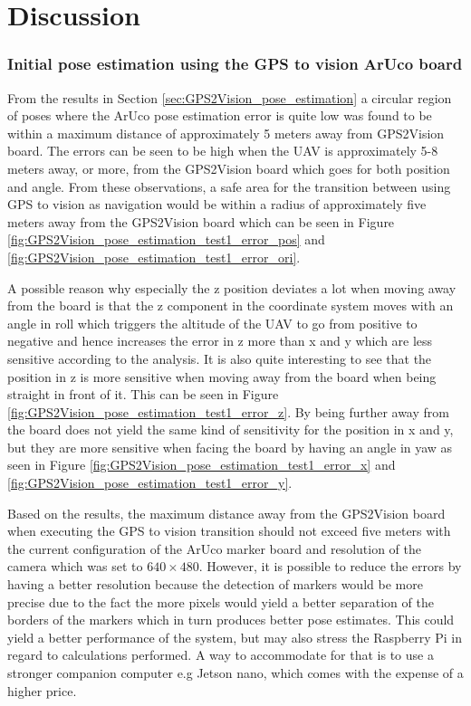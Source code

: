 \documentclass[../Head/report.tex]{subfiles}
\begin{document}
\section{Discussion}
\label{sec:discussion}

\subsubsection*{Initial pose estimation using the GPS to vision ArUco board}
From the results in Section \ref{sec:GPS2Vision_pose_estimation} a circular region of poses where the ArUco pose estimation error is quite low was found to be within a maximum distance of approximately 5 meters away from GPS2Vision board. The errors can be seen to be high when the UAV is approximately 5-8 meters away, or more, from the GPS2Vision board which goes for both position and angle. From these observations, a safe area for the transition between using GPS to vision as navigation would be within a radius of approximately five meters away from the GPS2Vision board which can be seen in Figure \ref{fig:GPS2Vision_pose_estimation_test1_error_pos} and \ref{fig:GPS2Vision_pose_estimation_test1_error_ori}. 

A possible reason why especially the z position deviates a lot when moving away from the board is that the z component in the coordinate system moves with an angle in roll which triggers the altitude of the UAV to go from positive to negative and hence increases the error in z more than x and y which are less sensitive according to the analysis. It is also quite interesting to see that the position in z is more sensitive when moving away from the board when being straight in front of it. This can be seen in Figure \ref{fig:GPS2Vision_pose_estimation_test1_error_z}. By being further away from the board does not yield the same kind of sensitivity for the position in x and y, but they are more sensitive when facing the board by having an angle in yaw as seen in Figure \ref{fig:GPS2Vision_pose_estimation_test1_error_x} and \ref{fig:GPS2Vision_pose_estimation_test1_error_y}.   

Based on the results, the maximum distance away from the GPS2Vision board when executing the GPS to vision transition should not exceed five meters with the current configuration of the ArUco marker board and resolution of the camera which was set to $640 \times 480$. However, it is possible to reduce the errors by having a better resolution because the detection of markers would be more precise due to the fact the more pixels would yield a better separation of the borders of the markers which in turn produces better pose estimates. This could yield a better performance of the system, but may also stress the Raspberry Pi in regard to calculations performed. A way to accommodate for that is to use a stronger companion computer e.g Jetson nano, which comes with the expense of a higher price.
\end{document}
